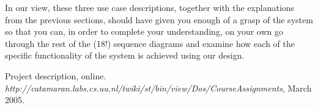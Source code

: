 \documentclass[a4paper,10pt]{article}
\begin{document}
In our view, these three use case descriptions, together with the explanations from the previous
sections, should have given you enough of a grasp of the system so that you can, in order to complete
your understanding, on your own go through the rest of the (18!) sequence diagrams and examine
how each of the specific functionality of the system is achieved using our design.

\begin{thebibliography}{99}

 Project description, online.\\
\textit{http://catamaran.labs.cs.uu.nl/twiki/st/bin/view/Dos/CourseAssignments}, March 2005.

\end{thebibliography}
\end{document}
